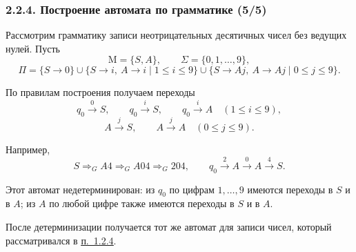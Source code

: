 \documentclass[mathserif,12pt,aspectratio=169]{beamer}
\let\le\leqslant
\def\DMref#1#2{{\color{blue}\underline{\hyperlink{#2}{#1}}}}
\begin{document}
\begin{frame}
\frametitle{2.2.4. Построение автомата по грамматике (5/5)}
\small

\begin{example}
Рассмотрим грамматику записи неотрицательных десятичных чисел
без ведущих нулей. Пусть
\[
\mathrm{M}=\{S,A\},
\qquad
\Sigma=\{0,1,\dots,9\},
\]
\[
\Pi=\{S\to 0\}\cup
\{S\to i,\ A\to i\mid 1\le i\le 9\}\cup
\{S\to Aj,\ A\to Aj\mid 0\le j\le 9\}.
\]

По правилам построения получаем переходы
\[
q_0\xrightarrow{0}S,\qquad
q_0\xrightarrow{i}S,\qquad
q_0\xrightarrow{i}A
\quad (1\le i\le 9),
\]
\[
A\xrightarrow{j}S,\qquad
A\xrightarrow{j}A
\quad (0\le j\le 9).
\]

Например,
\[
S\Rightarrow_G A4\Rightarrow_G A04\Rightarrow_G 204,
\qquad
q_0\xrightarrow{2}A\xrightarrow{0}A\xrightarrow{4}S.
\]

Этот автомат недетерминирован:
из \(q_0\) по цифрам \(1,\dots,9\) имеются переходы в \(S\) и в \(A\);
из \(A\) по любой цифре также имеются переходы в \(S\) и в \(A\).
\end{example}

\begin{remark}
После детерминизации получается тот же автомат для записи чисел,
который рассматривался в \DMref{п.~1.2.4}{1.2.4.}.
\end{remark}

\end{frame}
\end{document}
